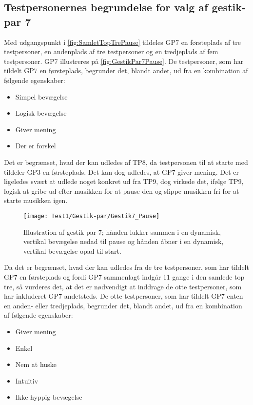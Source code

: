 \subsection{Testpersonernes begrundelse for valg af gestik-par 7}
\label{TestresultaterValgAfGestikkerBegrundelseGP7Pause}
%
Med udgangspunkt i \autoref{fig:SamletTopTrePause} tildeles GP7 en førsteplads af tre testpersoner, en andenplads af tre testpersoner og en tredjeplads af fem testpersoner. GP7 illustreres på \autoref{fig:GestikPar7Pause}. De testpersoner, som har tildelt GP7 en førsteplads, begrunder det, blandt andet, ud fra en kombination af følgende egenskaber: 
%
\begin{multicols}{3}
    \begin{itemize}
        \item Simpel bevægelse
        \item Logisk bevægelse
        \item Giver mening
        \item Der er forskel 
\end{itemize}
\end{multicols}
\noindent
%
Det er begrænset, hvad der kan udledes af TP8, da testpersonen til at starte med tildeler GP3 en førsteplads. Det kan dog udledes, at GP7 giver mening. Det er ligeledes svært at udlede noget konkret ud fra TP9, dog virkede det, ifølge TP9, logisk at gribe ud efter musikken for at pause den og slippe musikken fri for at starte musikken igen.
%
\begin{figure}[H]
	\centering
	\texttt{[image: Test1/Gestik-par/Gestik7\_Pause]}
	\caption{Illustration af gestik-par 7; hånden lukker sammen i en dynamisk, vertikal bevægelse nedad til pause og hånden åbner i en dynamisk, vertikal bevægelse opad til start.}
	\label{fig:GestikPar7Pause}
\end{figure}
\noindent
%
Da det er begrænset, hvad der kan udledes fra de tre testpersoner, som har tildelt GP7 en førsteplads og fordi GP7 sammenlagt indgår 11 gange i den samlede top tre, så vurderes det, at det er nødvendigt at inddrage de otte testpersoner, som har inkluderet GP7 andetsteds. De otte testpersoner, som har tildelt GP7 enten en anden- eller tredjeplads, begrunder det, blandt andet, ud fra en kombination af følgende egenskaber: 
%
\begin{multicols}{3}
    \begin{itemize}
        \item Giver mening
        \item Enkel
        \item Nem at huske
        \item Intuitiv
        \item Ikke hyppig bevægelse
\end{itemize}
\end{multicols}
